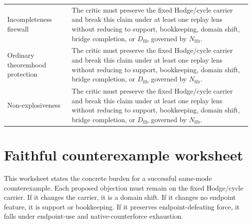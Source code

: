 \documentclass[11pt]{article}
\begin{document}
{\begin{longtable}{p{}p{}}
Incompleteness firewall & The critic must preserve the fixed Hodge/cycle carrier and break this claim under at least one replay lens without reducing to support, bookkeeping, domain shift, bridge completion, or $D_{\mathrm{fib}}$ governed by $N_{\mathrm{fib}}$.\\
Ordinary theoremhood protection & The critic must preserve the fixed Hodge/cycle carrier and break this claim under at least one replay lens without reducing to support, bookkeeping, domain shift, bridge completion, or $D_{\mathrm{fib}}$ governed by $N_{\mathrm{fib}}$.\\
Non-explosiveness & The critic must preserve the fixed Hodge/cycle carrier and break this claim under at least one replay lens without reducing to support, bookkeeping, domain shift, bridge completion, or $D_{\mathrm{fib}}$ governed by $N_{\mathrm{fib}}$.\\
\bottomrule
\end{longtable}
}

\section{Faithful counterexample worksheet}\label{app:counterexample-worksheet}

This worksheet states the concrete burden for a successful same-mode counterexample. Each proposed objection must remain on the fixed Hodge/cycle carrier. If it changes the carrier, it is a domain shift. If it changes no endpoint feature, it is support or bookkeeping. If it preserves endpoint-defeating force, it falls under endpoint-use and native-counterforce exhaustion.
\end{document}
